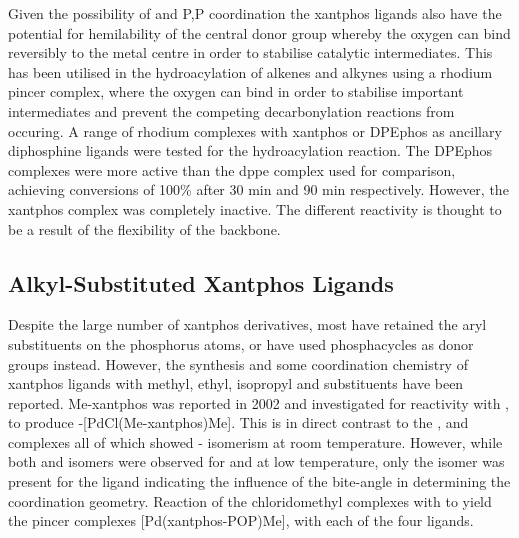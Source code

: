 Given the possibility of \POP{} and \dento{}P,P\textprime{} coordination the xantphos ligands also have the potential for hemilability of the central donor group whereby the oxygen can bind reversibly to the metal centre in order to stabilise catalytic intermediates. This has been utilised in the hydroacylation of alkenes and alkynes using a rhodium pincer complex, where the oxygen can bind in order to stabilise important intermediates and prevent the competing decarbonylation reactions from occuring.\cite{Moxham2006, Moxham2008, Pawley2010}  A range of rhodium complexes with \gls{xantphos} or \gls{DPEphos} as ancillary diphosphine ligands were tested for the hydroacylation reaction.\cite{Moxham2006}  The \gls{DPEphos} complexes were more active than the \gls{dppe} complex used for comparison, achieving conversions of 100\% after 30 min and 90 min respectively.  However, the xantphos complex was completely inactive.  The different reactivity is thought to be a result of the flexibility of the backbone.\cite{Pawley2010}

\subsection{Alkyl-Substituted Xantphos Ligands}

Despite the large number of xantphos derivatives, most have retained the aryl substituents on the phosphorus atoms, or have used phosphacycles as donor groups instead.  However, the synthesis and some coordination chemistry of xantphos ligands with methyl, ethyl, isopropyl and \tBu{} substituents have been reported.  Me-xantphos was reported in 2002 and investigated for reactivity with  , to produce \cis-[PdCl(Me-xantphos)Me].\cite{Zuideveld2002}  This is in direct contrast to the \Phsixantphos, \Phthixantphos{} and \Phxantphos{} complexes all of which showed \cis-\trans{} isomerism at room temperature.  However, while both \cis{} and \trans{} isomers were observed for \Phthixantphos{} and \Phxantphos{} at low temperature, only the \cis{} isomer was present for the \Phsixantphos{} ligand indicating the influence of the bite-angle in determining the coordination geometry.  Reaction of the chloridomethyl complexes with  to yield the pincer complexes [Pd(xantphos-\dento{}POP)Me]\ce{[CF3SO3]}, with each of the four ligands.  


